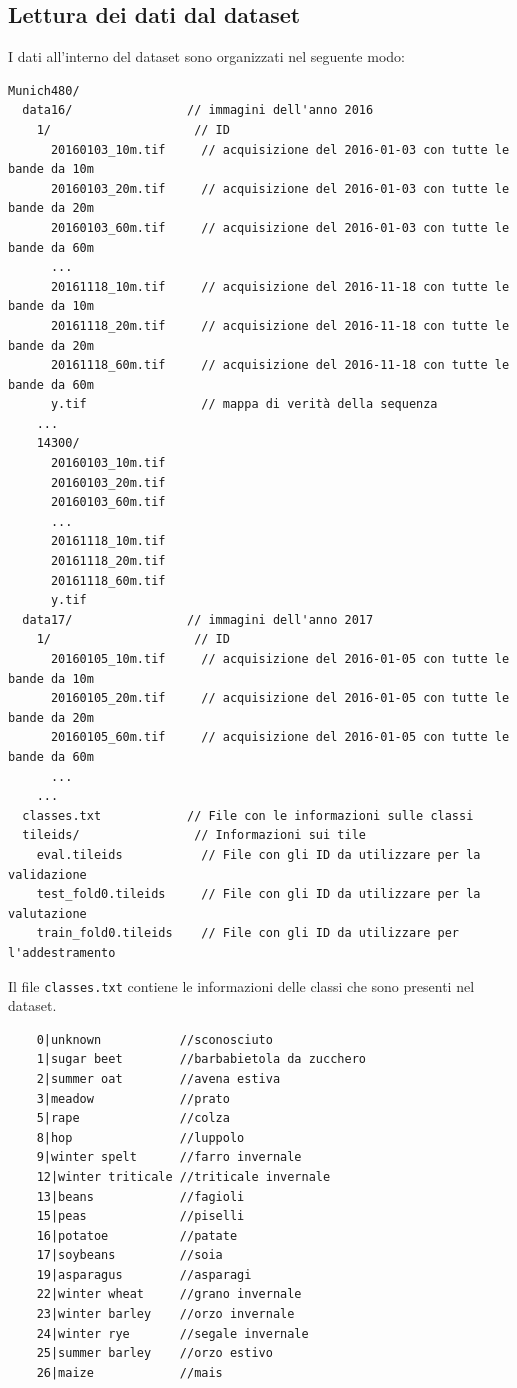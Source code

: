 \newpage
\subsection{Lettura dei dati dal dataset}
I dati all'interno del dataset sono organizzati nel seguente modo:
\begin{verbatim}
Munich480/
  data16/                // immagini dell'anno 2016
    1/                    // ID 
      20160103_10m.tif     // acquisizione del 2016-01-03 con tutte le bande da 10m
      20160103_20m.tif     // acquisizione del 2016-01-03 con tutte le bande da 20m
      20160103_60m.tif     // acquisizione del 2016-01-03 con tutte le bande da 60m
      ...
      20161118_10m.tif     // acquisizione del 2016-11-18 con tutte le bande da 10m
      20161118_20m.tif     // acquisizione del 2016-11-18 con tutte le bande da 20m
      20161118_60m.tif     // acquisizione del 2016-11-18 con tutte le bande da 60m            
      y.tif                // mappa di verità della sequenza
    ... 
    14300/             
      20160103_10m.tif
      20160103_20m.tif
      20160103_60m.tif 
      ...
      20161118_10m.tif 
      20161118_20m.tif 
      20161118_60m.tif               
      y.tif
  data17/                // immagini dell'anno 2017
    1/                    // ID 
      20160105_10m.tif     // acquisizione del 2016-01-05 con tutte le bande da 10m
      20160105_20m.tif     // acquisizione del 2016-01-05 con tutte le bande da 20m
      20160105_60m.tif     // acquisizione del 2016-01-05 con tutte le bande da 60m
      ...
    ...
  classes.txt            // File con le informazioni sulle classi
  tileids/                // Informazioni sui tile
    eval.tileids           // File con gli ID da utilizzare per la validazione
    test_fold0.tileids     // File con gli ID da utilizzare per la valutazione
    train_fold0.tileids    // File con gli ID da utilizzare per l'addestramento
\end{verbatim}

Il file \texttt{classes.txt} contiene le informazioni delle classi che sono presenti 
nel dataset.
\begin{verbatim}
    0|unknown           //sconosciuto
    1|sugar beet        //barbabietola da zucchero
    2|summer oat        //avena estiva
    3|meadow            //prato
    5|rape              //colza
    8|hop               //luppolo
    9|winter spelt      //farro invernale
    12|winter triticale //triticale invernale
    13|beans            //fagioli
    15|peas             //piselli
    16|potatoe          //patate
    17|soybeans         //soia
    19|asparagus        //asparagi
    22|winter wheat     //grano invernale
    23|winter barley    //orzo invernale
    24|winter rye       //segale invernale
    25|summer barley    //orzo estivo
    26|maize            //mais
\end{verbatim}

